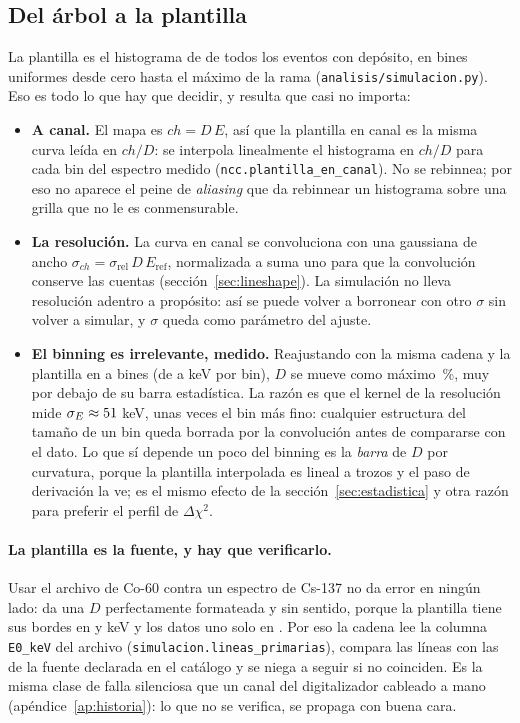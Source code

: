 \documentclass[11pt,a4paper]{article}
\begin{document}
\subsection{Del árbol a la plantilla}

La plantilla es el histograma de \texttt{\Rama} de todos los eventos con
depósito, en \SimBinsPlantilla{} bines uniformes desde cero hasta el máximo de la rama
(\texttt{analisis/simulacion.py}). Eso es todo lo que hay que decidir, y
resulta que casi no importa:

\begin{itemize}
\item \textbf{A canal.} El mapa es $ch = D\,E$, así que la plantilla en canal
      es la misma curva leída en $ch/D$: se interpola linealmente el
      histograma en $ch/D$ para cada bin del espectro medido
      (\texttt{ncc.plantilla\_en\_canal}). No se rebinnea; por eso no aparece
      el peine de \emph{aliasing} que da rebinnear un histograma sobre una
      grilla que no le es conmensurable.
\item \textbf{La resolución.} La curva en canal se convoluciona con una
      gaussiana de ancho $\sigma_{ch} = \sigma_{\text{rel}}\,D\,E_{\text{ref}}$,
      normalizada a suma uno para que la convolución conserve las cuentas
      (sección~\ref{sec:lineshape}). La simulación no lleva resolución
      adentro a propósito: así se puede volver a borronear con otro $\sigma$
      sin volver a simular, y $\sigma$ queda como parámetro del ajuste.
\item \textbf{El binning es irrelevante, medido.} Reajustando \EjCorrida{}
      con la misma cadena y la plantilla en \BinsMin{} a \BinsMax{} bines
      (de \BinsAnchoMax{} a \BinsAnchoMin{} keV por bin), $D$ se mueve como
      máximo \BinsDesvMax\,\%, muy por debajo de su barra estadística. La
      razón es que el kernel de la resolución mide $\sigma_E \approx
      51$ keV, unas \BinsSigmaSobreBin{} veces el bin más fino:
      cualquier estructura del tamaño de un bin queda borrada por la
      convolución antes de compararse con el dato. Lo que sí depende un poco
      del binning es la \emph{barra} de $D$ por curvatura, porque la plantilla
      interpolada es lineal a trozos y el paso de derivación la ve; es el
      mismo efecto de la sección~\ref{sec:estadistica} y otra razón para
      preferir el perfil de $\Delta\chi^2$.
\end{itemize}

\paragraph{La plantilla es la fuente, y hay que verificarlo.} Usar el archivo
de Co-60 contra un espectro de Cs-137 no da error en ningún lado: da una $D$
perfectamente formateada y sin sentido, porque la plantilla tiene sus bordes
en \BordeCoA{} y \BordeCoB{} keV y los datos uno solo en \BordeCs. Por eso la
cadena lee la columna \texttt{E0\_keV} del archivo
(\texttt{simulacion.lineas\_primarias}), compara las líneas con las de la
fuente declarada en el catálogo y se niega a seguir si no coinciden. Es la
misma clase de falla silenciosa que un canal del digitalizador cableado a
mano (apéndice~\ref{ap:historia}): lo que no se verifica, se propaga con buena
cara.
\end{document}
